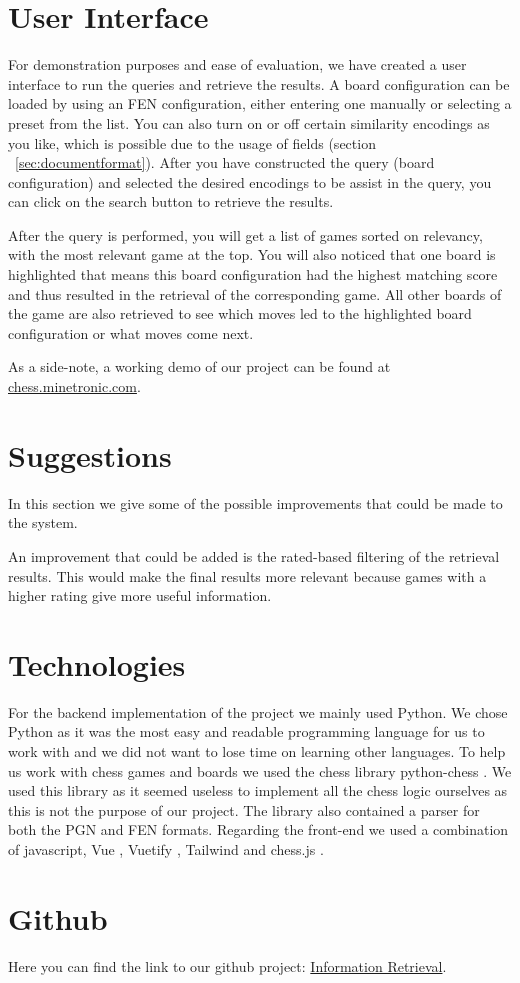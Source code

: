 \documentclass[11pt]{article}
\begin{document}
    \section{User Interface}

    For demonstration purposes and ease of evaluation, we have created a user interface to run the queries and retrieve the results. A board configuration can be loaded by using an FEN configuration, either entering one manually or selecting a preset from the list. You can also turn on or off certain similarity encodings as you like, which is possible due to the usage of fields (section ~\ref{sec:documentformat}). After you have constructed the query (board configuration) and selected the desired encodings to be assist in the query, you can click on the search button to retrieve the results.

    After the query is performed, you will get a list of games sorted on relevancy, with the most relevant game at the top. You will also noticed that one board is highlighted that means this board configuration had the highest matching score and thus resulted in the retrieval of the corresponding game. All other boards of the game are also retrieved to see which moves led to the highlighted board configuration or what moves come next.

    As a side-note, a working demo of our project can be found at \href{http://chess.minetronic.com}{chess.minetronic.com}.


    \section{Suggestions}

    In this section we give some of the possible improvements that could be made to the system.

    An improvement that could be added is the rated-based filtering of the retrieval results. This would make the final results more relevant because games with a higher rating give more useful information.


    \section{Technologies}

    For the backend implementation of the project we mainly used Python. We chose Python as it was the most easy and readable programming language for us to work with and we did not want to lose time on learning other languages. To help us work with chess games and boards we used the chess library python-chess \cite{python-chess}. We used this library as it seemed useless to implement all the chess logic ourselves as this is not the purpose of our project. The library also contained a parser for both the PGN and FEN formats. Regarding the front-end we used a combination of javascript, Vue \cite{Vue}, Vuetify \cite{Vuetify}, Tailwind \cite{Tailwindcss} and chess.js \cite{chess.js}.

    \section{Github}

    Here you can find the link to our github project: \href{https://github.com/RobMandelings/InformationRetrieval.git}{Information Retrieval}.

    

\end{document}
